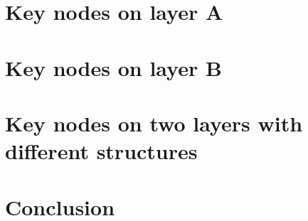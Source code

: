 \section{Key nodes on layer A}



\section{Key nodes on layer B}



\section{Key nodes on two layers with different structures}


\section{Conclusion}
